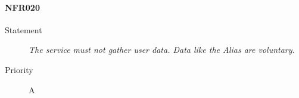 \paragraph{NFR020}
\begin{description}
  \item [Statement] \textit{The service must not gather user data. Data like the \gls{Alias} are voluntary.}
  \item [Priority] A
\end{description}
